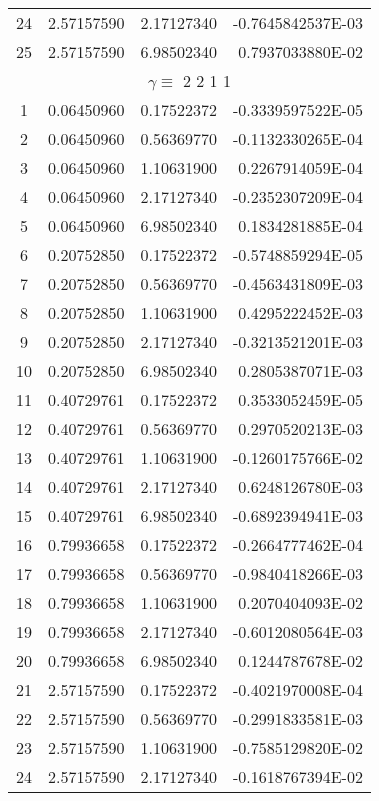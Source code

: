 \begin{longtable}{@{\extracolsep{\fill}}cllr@{}}
24  &  2.57157590  &  2.17127340  &  -0.7645842537E-03 \\
25  &  2.57157590  &  6.98502340  &   0.7937033880E-02 \\
\midrule
\multicolumn{4}{c}{ $\gamma \equiv $  2 2 1 1} \\
\midrule
1  &  0.06450960  &  0.17522372  &  -0.3339597522E-05 \\
2  &  0.06450960  &  0.56369770  &  -0.1132330265E-04 \\
3  &  0.06450960  &  1.10631900  &   0.2267914059E-04 \\
4  &  0.06450960  &  2.17127340  &  -0.2352307209E-04 \\
5  &  0.06450960  &  6.98502340  &   0.1834281885E-04 \\
6  &  0.20752850  &  0.17522372  &  -0.5748859294E-05 \\
7  &  0.20752850  &  0.56369770  &  -0.4563431809E-03 \\
8  &  0.20752850  &  1.10631900  &   0.4295222452E-03 \\
9  &  0.20752850  &  2.17127340  &  -0.3213521201E-03 \\
10  &  0.20752850  &  6.98502340  &   0.2805387071E-03 \\
11  &  0.40729761  &  0.17522372  &   0.3533052459E-05 \\
12  &  0.40729761  &  0.56369770  &   0.2970520213E-03 \\
13  &  0.40729761  &  1.10631900  &  -0.1260175766E-02 \\
14  &  0.40729761  &  2.17127340  &   0.6248126780E-03 \\
15  &  0.40729761  &  6.98502340  &  -0.6892394941E-03 \\
16  &  0.79936658  &  0.17522372  &  -0.2664777462E-04 \\
17  &  0.79936658  &  0.56369770  &  -0.9840418266E-03 \\
18  &  0.79936658  &  1.10631900  &   0.2070404093E-02 \\
19  &  0.79936658  &  2.17127340  &  -0.6012080564E-03 \\
20  &  0.79936658  &  6.98502340  &   0.1244787678E-02 \\
21  &  2.57157590  &  0.17522372  &  -0.4021970008E-04 \\
22  &  2.57157590  &  0.56369770  &  -0.2991833581E-03 \\
23  &  2.57157590  &  1.10631900  &  -0.7585129820E-02 \\
24  &  2.57157590  &  2.17127340  &  -0.1618767394E-02 \\

\end{longtable}
